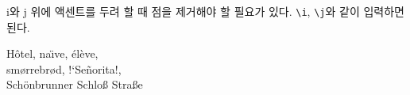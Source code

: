 i와 j 위에 액센트를 두려 할 때 점을 제거해야 할 필요가 있다. \verb|\i|, \verb|\j|와 같이 입력하면 된다.




\begin{example}
H\^otel, na\"\i ve, \'el\`eve,\\
sm\o rrebr\o d, !`Se\~norita!,\\
Sch\"onbrunner Schlo\ss{}
Stra\ss e
\end{example}

